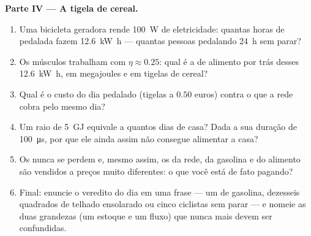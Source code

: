 \begin{problem}
\medskip
\noindent\textbf{Parte IV --- A tigela de cereal.}
\begin{enumerate}[resume]
  \item Uma bicicleta geradora rende \qty{100}{W} de eletricidade:
        quantas horas de pedalada fazem \qty{12.6}{kW.h} --- quantas
        pessoas pedalando \qty{24}{h} sem parar?
  \item Os músculos trabalham com $\eta \approx 0.25$: qual é a 
        de alimento por trás desses \qty{12.6}{kW.h}, em megajoules e em
        tigelas de cereal?
  \item Qual é o custo do dia pedalado (tigelas a $0.50$ euros) contra o
        que a rede cobra pelo mesmo dia?
  \item Um raio de \qty{5}{GJ} equivale a quantos dias de casa? Dada a
        sua duração de \qty{100}{\micro s}, por que ele ainda assim não
        consegue alimentar a casa?
  \item Os  nunca se perdem e, mesmo assim, os  da rede, da
        gasolina e do alimento são vendidos a preços muito diferentes: o
        que você está de fato pagando?
  \item Final: enuncie o veredito do dia em uma frase --- um 
        de gasolina, dezesseis  quadrados de telhado ensolarado ou
        cinco ciclistas sem parar --- e nomeie as duas grandezas (um
        estoque e um fluxo) que nunca mais devem ser confundidas.
\end{enumerate}
\end{problem}
